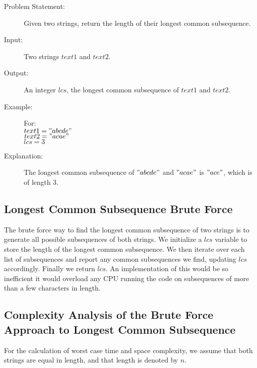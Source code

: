 \begin{description}
    \item[Problem Statement:]
        Given two strings, return the length of their longest common subsequence.

    \item[Input:] 
        Two strings $text1$ and $text2$.
    \item[Output:] 
        An integer $lcs$, the longest common subsequence of $text1$ and $text2$.
        
    \item[Example:] For:\\
        $text1 = "abcde"$\\
        $text2 = "acae"$\\
        $lcs = 3$

    \item[Explanation:]
        The longest common subsequence of $"abcde"$ and $"acae"$ is $"ace"$, which is of length $3$.
   
\end{description}

\subsection{Longest Common Subsequence Brute Force}
The brute force way to find the longest common subsequence of two strings is to generate all possible subsequences of both strings.
We initialize a $lcs$ variable to store the length of the longest common subsequence.
We then iterate over each list of subsequences and report any common subsequences we find, updating $lcs$ accordingly.
Finally we return $lcs$. An implementation of this would be so inefficient it would overload any CPU running the code on subsequences of more than a few characters in length.

\subsection{Complexity Analysis of the Brute Force Approach to Longest Common Subsequence}
For the calculation of worst case time and space complexity, we assume that both strings are equal in length, and that length is denoted by $n$.

